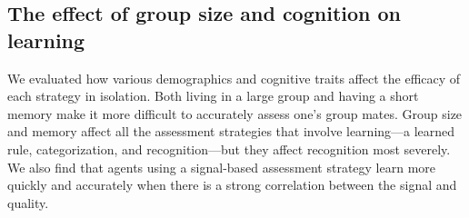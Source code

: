 \subsection*{The effect of group size and cognition on learning} 

We evaluated how various demographics and cognitive traits affect the efficacy of each strategy in isolation. Both living in a large group and having a short memory make it more difficult to accurately assess one's group mates. Group size and memory affect all the assessment strategies that involve learning---a learned rule, categorization, and recognition---but they affect recognition most severely. We also find that agents using a signal-based assessment strategy learn more quickly and accurately when there is a strong correlation between the signal and quality. 

